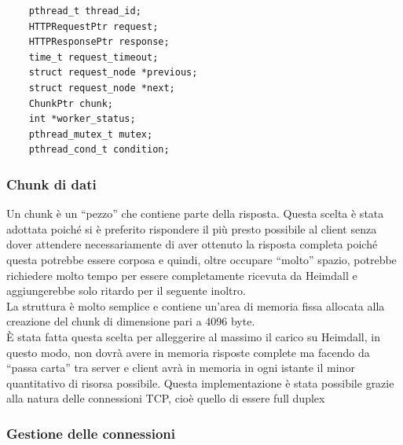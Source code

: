 \documentclass[italian]{tktltiki2}
\begin{document}
\begin{lstlisting}
    pthread_t thread_id;
    HTTPRequestPtr request;
    HTTPResponsePtr response;
    time_t request_timeout;
    struct request_node *previous;
    struct request_node *next;
    ChunkPtr chunk;
    int *worker_status;
    pthread_mutex_t mutex;
    pthread_cond_t condition;
\end{lstlisting}

\subsubsection*{Chunk di dati}
\label{sec:chunk}
Un chunk è un ``pezzo'' che contiene parte della risposta. Questa scelta è stata adottata poiché si è preferito rispondere il più presto possibile al client senza dover attendere necessariamente di aver ottenuto la risposta completa poiché questa potrebbe essere corposa e quindi, oltre occupare ``molto'' spazio, potrebbe richiedere molto tempo per essere completamente ricevuta da Heimdall e aggiungerebbe solo ritardo per il seguente inoltro. 
\\
La struttura è molto semplice e contiene un'area di memoria fissa allocata alla creazione del chunk di dimensione pari a 4096 byte.
\\
È stata fatta questa scelta per alleggerire al massimo il carico su Heimdall, in questo modo, non dovrà avere in memoria risposte complete ma facendo da ``passa carta'' tra server e client avrà in memoria in ogni istante il minor quantitativo di risorsa possibile. Questa implementazione è stata possibile grazie alla natura delle connessioni TCP, cioè quello di essere full duplex

\subsubsection{Gestione delle connessioni}
\end{document}
